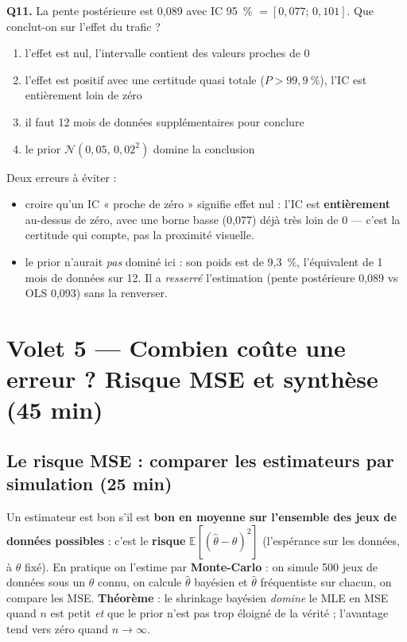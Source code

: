 \documentclass[11pt,a4paper]{article}
\begin{document}
\begin{qcmbox}[Question 11]
\textbf{Q11.} La pente postérieure est 0,089 avec IC 95~\% $= [0{,}077;\, 0{,}101]$.
Que conclut-on sur l'effet du trafic ?
\begin{enumerate}[label=\Alph*.), leftmargin=8mm, itemsep=0.3mm]
  \item l'effet est nul, l'intervalle contient des valeurs proches de 0
  \item l'effet est positif avec une certitude quasi totale ($P > 99{,}9~\%$),
        l'IC est entièrement loin de zéro
  \item il faut 12 mois de données supplémentaires pour conclure
  \item le prior $\mathcal{N}(0{,}05,\, 0{,}02^2)$ domine la conclusion
\end{enumerate}
\end{qcmbox}

\begin{piege}[Question 11]
Deux erreurs à éviter :
\begin{itemize}[leftmargin=4mm, itemsep=0.5mm]
  \item croire qu'un IC « proche de zéro » signifie effet nul : l'IC est
        \textbf{entièrement} au-dessus de zéro, avec une borne basse
        (0,077) déjà très loin de 0 --- c'est la certitude qui compte, pas la
        proximité visuelle.
  \item le prior n'aurait \emph{pas} dominé ici : son poids est de 9,3~\%,
        l'équivalent de 1 mois de données sur 12. Il a \emph{resserré}
        l'estimation (pente postérieure 0,089 vs OLS 0,093) sans la
        renverser.
\end{itemize}
\end{piege}

\section{Volet 5 --- Combien coûte une erreur ? Risque MSE et synthèse (45 min)}

\subsection{Le risque MSE : comparer les estimateurs par simulation (25 min)}

\begin{rappel}
Un estimateur est bon s'il est \textbf{bon en moyenne sur l'ensemble des
jeux de données possibles} : c'est le \textbf{risque} $\mathbb{E}[(\hat\theta - \theta)^2]$
(l'espérance sur les données, à $\theta$ fixé). En pratique on l'estime par
\textbf{Monte-Carlo} : on simule 500 jeux de données sous un $\theta$ connu, on
calcule $\hat\theta$ bayésien et $\hat\theta$ fréquentiste sur chacun, on compare
les MSE. \textbf{Théorème} : le shrinkage bayésien \emph{domine} le MLE en MSE
quand $n$ est petit \emph{et} que le prior n'est pas trop éloigné de la vérité ;
l'avantage tend vers zéro quand $n \to \infty$.
\end{rappel}
\end{document}
